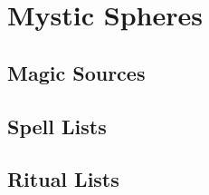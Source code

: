 \chapter{Mystic Spheres}\label{Mystic Spheres}

\section{Magic Sources}\label{Magic Sources}

  

  \newpage
\section{Spell Lists}\label{Spell Lists}

  

  

\section{Ritual Lists}\label{Ritual Lists}

  

  
